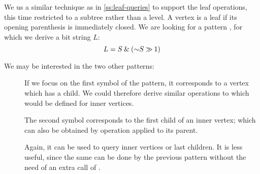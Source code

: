 We us a similar technique as in \ref{ss:leaf-queries} to support the leaf operations, this time restricted to a subtree rather than a level.
A vertex is a leaf if its opening parenthesis is immediately closed.
We are looking for a pattern \str{()}, for which we derive a bit string $L$:
$$L = S \mathbin{\&} (\mathord{\sim} S \mathbin{\gg} 1)$$

\begin{algorithm}
\begin{algorithmic}
		\State {}
	\Else
		\State {}
	\EndIf
\EndFunction
\end{algorithmic}
\end{algorithm}

\begin{algorithm}
\begin{algorithmic}	
 
		\State {}
	\Else
		\State {}
	\EndIf
\EndFunction
\end{algorithmic}
\end{algorithm}

\begin{algorithm}
\begin{algorithmic}
		\State {}
	\Else
		\State {}
	\EndIf
\EndFunction
\end{algorithmic}
\end{algorithm}

\bigbreak

We may be interested in the two other patterns:
\begin{description}
	\item[\str{((}]
	If we focus on the first symbol of the pattern, it corresponds to a vertex which has a child.
	We could therefore derive similar operations to \leafAny{} which would be defined for inner vertices.
	
	The second symbol corresponds to the first child of an inner vertex; which can also be obtained by \childFirst{} operation applied to its parent.
	
	\item[\str{))}]
	Again, it can be used to query inner vertices or last children.
	It is less useful, since the same can be done by the previous pattern without the need of an extra call of \findOpen{}.
\end{description}

